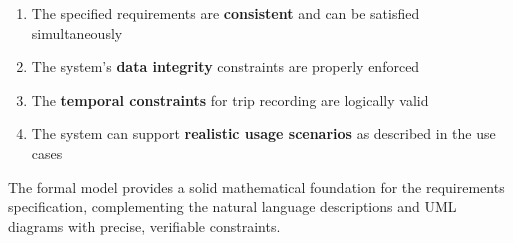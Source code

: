\begin{enumerate}
    \item The specified requirements are \textbf{consistent} and can be satisfied simultaneously
    \item The system's \textbf{data integrity} constraints are properly enforced
    \item The \textbf{temporal constraints} for trip recording are logically valid
    \item The system can support \textbf{realistic usage scenarios} as described in the use cases
\end{enumerate}

The formal model provides a solid mathematical foundation for the requirements specification, complementing the natural language descriptions and UML diagrams with precise, verifiable constraints. 
